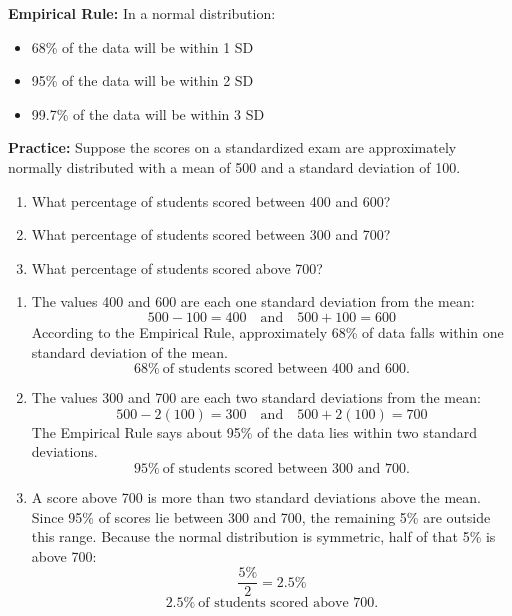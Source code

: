 \begin{tcolorbox}[title=Key Results, colback=purple!5!white, colframe=purple!75!black, breakable]
\textbf{Empirical Rule:}
In a normal distribution:
\begin{itemize}
  \item 68\% of the data will be within 1 SD
  \item 95\% of the data will be within 2 SD
  \item 99.7\% of the data will be within 3 SD
\end{itemize}
\end{tcolorbox}
\par\medskip

\textbf{Practice:} Suppose the scores on a standardized exam are approximately normally distributed with a mean of 500 and a standard deviation of 100.
\begin{enumerate}
    \item What percentage of students scored between 400 and 600?
    \item What percentage of students scored between 300 and 700?
    \item What percentage of students scored above 700?
\end{enumerate}
\bigskip

\begin{enumerate}
    \item The values 400 and 600 are each one standard deviation from the mean:
    \[
    500 - 100 = 400 \quad \text{and} \quad 500 + 100 = 600
    \]
    According to the Empirical Rule, approximately 68\% of data falls within one standard deviation of the mean.
    \[
    \boxed{68\%\ \text{of students scored between 400 and 600.}}
    \]

    \item The values 300 and 700 are each two standard deviations from the mean:
    \[
    500 - 2(100) = 300 \quad \text{and} \quad 500 + 2(100) = 700
    \]
    The Empirical Rule says about 95\% of the data lies within two standard deviations.
    \[
    \boxed{95\%\ \text{of students scored between 300 and 700.}}
    \]

    \item A score above 700 is more than two standard deviations above the mean. Since 95\% of scores lie between 300 and 700, the remaining 5\% are outside this range. Because the normal distribution is symmetric, half of that 5\% is above 700:
    \[
    \frac{5\%}{2} = 2.5\%
    \]
    \[
    \boxed{2.5\%\ \text{of students scored above 700.}}
    \]
\end{enumerate}







